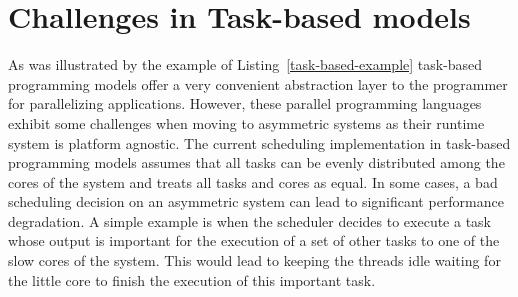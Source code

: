 

\section{Challenges in Task-based models}

As was illustrated by the example of Listing~\ref{task-based-example} task-based programming models offer a very convenient abstraction layer to the programmer for parallelizing applications.
However, these parallel programming languages exhibit some challenges when moving to asymmetric systems as their runtime system is platform agnostic.
The current scheduling implementation in task-based programming models assumes that all tasks can be evenly distributed among the cores of the system and treats all tasks and cores as equal.
In some cases, a bad scheduling decision on an asymmetric system can lead to significant performance degradation. 
A simple example is when the scheduler decides to execute a task whose output is important for the execution of a set of other tasks to one of the slow cores of the system.
This would lead to keeping the threads idle waiting for the little core to finish the execution of this important task.

